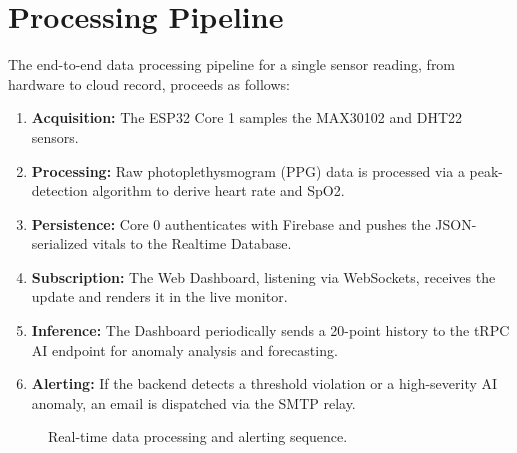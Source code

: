 \section{Processing Pipeline}

The end-to-end data processing pipeline for a single sensor reading, from hardware
to cloud record, proceeds as follows:

\begin{enumerate}
    \item \textbf{Acquisition:} The ESP32 Core 1 samples the MAX30102 and DHT22 sensors.
    \item \textbf{Processing:} Raw photoplethysmogram (PPG) data is processed via a peak-detection algorithm to derive heart rate and SpO2.
    \item \textbf{Persistence:} Core 0 authenticates with Firebase and pushes the JSON-serialized vitals to the Realtime Database.
    \item \textbf{Subscription:} The Web Dashboard, listening via WebSockets, receives the update and renders it in the live monitor.
    \item \textbf{Inference:} The Dashboard periodically sends a 20-point history to the tRPC AI endpoint for anomaly analysis and forecasting.
    \item \textbf{Alerting:} If the backend detects a threshold violation or a high-severity AI anomaly, an email is dispatched via the SMTP relay.
\end{enumerate}

\begin{figure}[H]
    \centering
    \caption{Real-time data processing and alerting sequence.}
    \label{fig:data_sequence}
\end{figure}
